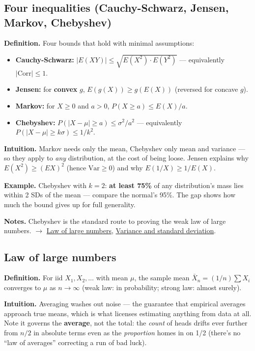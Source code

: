 \documentclass[11pt,a4paper]{article}
\begin{document}
\subsection{Four inequalities (Cauchy-Schwarz, Jensen, Markov, Chebyshev)}\label{sec:four-inequalities-cauchy-schwarz-jensen-markov-chebyshev}

\textbf{Definition.} Four bounds that hold with minimal assumptions:
\begin{itemize}[leftmargin=1.4em]
\item \textbf{Cauchy-Schwarz:} $|E(XY)| \leq  \sqrt{E(X^{2})\cdot E(Y^{2})}$ --- equivalently $|\mathrm{Corr}| \leq  1$.
\item \textbf{Jensen:} for \textbf{convex} $g$, $E(g(X)) \geq  g(E(X))$ (reversed for concave $g$).
\item \textbf{Markov:} for $X \geq  0$ and $a > 0$, $P(X \geq  a) \leq  E(X)/a$.
\item \textbf{Chebyshev:} $P(|X - \mu | \geq  a) \leq  \sigma ^{2}/a^{2}$ --- equivalently $P(|X - \mu | \geq  k\sigma ) \leq  1/k^{2}$.
\end{itemize}

\textbf{Intuition.} Markov needs only the mean, Chebyshev only mean and variance --- so they apply to \textit{any} distribution, at the cost of being loose. Jensen explains why $E(X^{2}) \geq  (E X)^{2}$ (hence $\mathrm{Var} \geq  0$) and why $E(1/X) \geq  1/E(X)$.

\textbf{Example.} Chebyshev with $k = 2$: \textbf{at least 75\%} of any distribution's mass lies within 2 SDs of the mean --- compare the normal's 95\%. The gap shows how much the bound gives up for full generality.

\textbf{Notes.} Chebyshev is the standard route to proving the weak law of large numbers. $\to$ \hyperref[sec:law-of-large-numbers]{Law of large numbers}, \hyperref[sec:variance-and-standard-deviation]{Variance and standard deviation}.

\subsection{Law of large numbers}\label{sec:law-of-large-numbers}

\textbf{Definition.} For iid $X_{1}, X_{2}, \ldots$ with mean $\mu$, the sample mean $\bar{X}_{n} = (1/n)\sum X_{i}$ converges to $\mu$ as $n \to  \infty$ (weak law: in probability; strong law: almost surely).

\textbf{Intuition.} Averaging washes out noise --- the guarantee that empirical averages approach true means, which is what licenses estimating anything from data at all. Note it governs the \textbf{average}, not the total: the \textit{count} of heads drifts ever further from $n/2$ in absolute terms even as the \textit{proportion} homes in on 1/2 (there's no ``law of averages'' correcting a run of bad luck).
\end{document}

